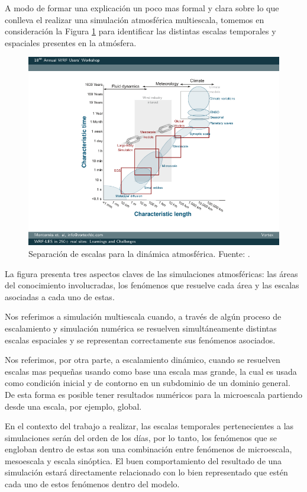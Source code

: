 A modo de formar una explicación un poco mas formal y clara sobre lo que conlleva el realizar una simulación atmosférica multiescala, tomemos en consideración la Figura \ref{fig:02_escalas} para identificar las distintas escalas temporales y espaciales presentes en la atmósfera.

\begin{figure}[h!]
	\centering
	\includegraphics[width=0.8\linewidth,trim={2.6cm 1.4cm 1.5cm 0.8cm},clip]{Imagenes/02/escalas}
	\caption{Separación de escalas para la dinámica atmosférica. Fuente: \cite{vortex2017}.}
	\label{fig:02_escalas}
\end{figure}

La figura presenta tres aspectos claves de las simulaciones atmosféricas: las áreas del conocimiento involucradas, los fenómenos que resuelve cada área y las escalas asociadas a cada uno de estas.

Nos referimos a simulación multiescala cuando, a través de algún proceso de escalamiento y simulación numérica se resuelven simultáneamente distintas escalas espaciales y se representan correctamente sus fenómenos asociados.
 
Nos referimos, por otra parte, a escalamiento dinámico, cuando se resuelven escalas mas pequeñas usando como base una escala mas grande, la cual es usada como condición inicial y de contorno en un subdominio de un dominio general. De esta forma es posible tener resultados numéricos para la microescala partiendo desde una escala, por ejemplo, global. 

En el contexto del trabajo a realizar, las escalas temporales pertenecientes a las simulaciones serán del orden de los días, por lo tanto, los fenómenos que se engloban dentro de estas son una combinación entre fenómenos de microescala, mesoescala y escala sinóptica. El buen comportamiento del resultado de una simulación estará directamente relacionado con lo bien representado que estén cada uno de estos fenómenos dentro del modelo.


